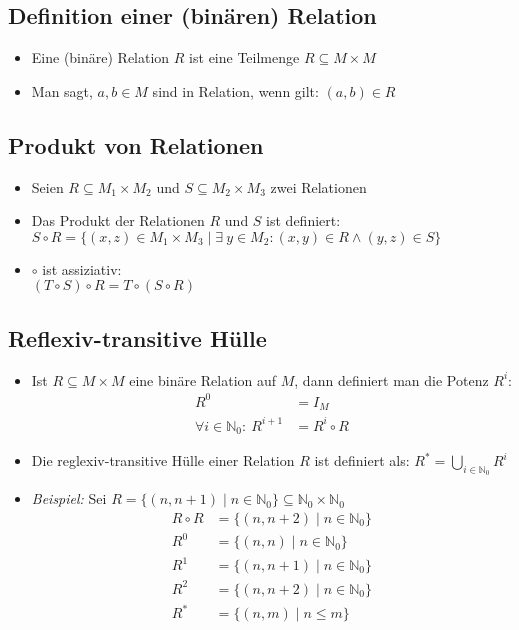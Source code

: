 \documentclass{article}
\newcommand{\Nz}{{\mathbb{N}_0}} %
\newcommand{\important}[1]{\textcolor{importantColor}{#1}}
\newcommand{\example}[1]{\textit{Beispiel: }#1}
\newcommand{\set}[1]{\{#1\}}
\begin{document}
\subsection{Definition einer (binären) Relation}
\begin{itemize}
    \item Eine (binäre) Relation $R$ ist eine Teilmenge $R \subseteq M \times M$
    \item Man sagt, $a,b \in M$ sind in Relation, wenn gilt: $(a,b)\in R$
\end{itemize}
\subsection{Produkt von Relationen}
\begin{itemize}
    \item Seien $R\subseteq M_1\times M_2$ und $S\subseteq M_2 \times M_3$ zwei Relationen
    \item Das \important{Produkt der Relationen} $R$ und $S$ ist definiert:\\
    $S\circ R=\set{(x,z)\in M_1 \times M_3 \mid \exists\: y\in M_2: (x,y)\in R \land (y,z)\in S}$
    \item $\circ$ ist assiziativ:\\
    $(T\circ S)\circ R = T\circ(S\circ R)$
\end{itemize}
\subsection{Reflexiv-transitive Hülle}
\begin{itemize}
    \item Ist $R\subseteq M\times M$ eine binäre Relation auf $M$, dann definiert man die \important{Potenz $R^i$}:
    \begin{align*}
    R^0 &= I_M\\
    \forall i \in \Nz:\:R^{i+1} &= R^i\circ R
    \end{align*}
    \item Die \important{reglexiv-transitive Hülle} einer Relation $R$ ist definiert als: $R^*=\displaystyle{\bigcup_{i\in \Nz}}R^i$
    \item \example{Sei $R=\set{(n, n+1)\mid n\in\Nz}\subseteq\Nz\times\Nz$}
    \begin{align*}
        R\circ R &= \set{(n, n+2)\mid n\in\Nz}\\
        R^0 &= \set{(n,n)\mid n\in\Nz}\\
        R^1 &= \set{(n,n+1)\mid n\in\Nz}\\
        R^2 &= \set{(n,n+2)\mid n\in\Nz}\\
        R^* &= \set{(n,m)\mid n\leq m}
    \end{align*}
\end{itemize}
\end{document}
